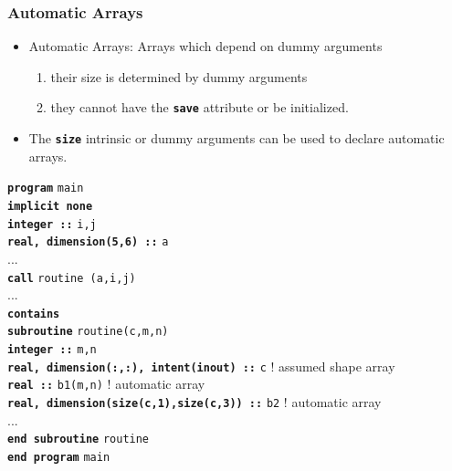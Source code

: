 \documentclass[slidestop,mathserif,compress,xcolor=svgnames]{beamer}
\newcommand{\bftt}[1]{\textbf{\texttt{#1}}}
\newenvironment{bblock}[0]
{
\begin{beamerboxesrounded}[upper=uppercol1,lower=lowercol1,shadow=true]}
{\end{beamerboxesrounded}}
\begin{document}
\begin{frame}
  \frametitle{\small Automatic Arrays}
  \begin{itemize}
    \item Automatic Arrays: Arrays which depend on dummy arguments
    \begin{enumerate}
      \item their size is determined by dummy arguments
      \item they cannot have the \textbf{\texttt{save}} attribute or be initialized.
    \end{enumerate}
    \item The \textbf{\texttt{size}} intrinsic or dummy arguments can be used to declare automatic arrays.
  \end{itemize}
  \begin{bblock}{}
    \begin{tabbing}
      \bftt{pr}\=\bftt{ogram} \texttt{main} \\
      \> \bftt{im}\=\bftt{plicit none} \\
      \>\> \bftt{integer ::} \texttt{i,j} \\
      \>\> \bftt{real, dimension(5,6) ::} \texttt{a} \\
      \>\> ... \\
      \>\> \bftt{call} \texttt{routine (a,i,j)} \\
      \>\> ... \\
      \> \bftt{contains} \\
      \>\> \bftt{su}\=\bftt{broutine} \texttt{routine(c,m,n)} \\
      \>\>\>\bftt{integer ::} \texttt{m,n} \\
      \>\>\>\bftt{real, dimension(:,:), intent(inout) ::} \texttt{c}    ! assumed shape array \\
      \>\>\>\bftt{real ::} \texttt{b1(m,n)}                             ! automatic array \\
      \>\>\>\bftt{real, dimension(size(c,1),size(c,3)) ::} \texttt{b2}  ! automatic array \\
      \>\>\> ... \\
      \>\> \bftt{end subroutine} \texttt{routine} \\
      \bftt{end program} \texttt{main} 
    \end{tabbing}
  \end{bblock}
\end{frame}
\end{document}
